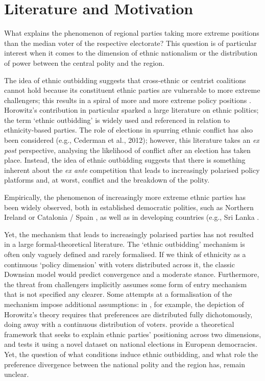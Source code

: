 \documentclass[11pt]{article}
\begin{document}
\section{Literature and Motivation}

What explains the phenomenon of regional parties taking more extreme positions than the median voter of the respective electorate? This question is of particular interest when it comes to the dimension of ethnic nationalism or the distribution of power between the central polity and the region.

The idea of ethnic outbidding suggests that cross-ethnic or centrist coalitions cannot hold because its constituent ethnic parties are vulnerable to more extreme challengers; this results in a spiral of more and more extreme policy positions \parencite{Horowitz2000, Rabushka1972, Chandra2005}. Horowitz's contribution in particular sparked a large literature on ethnic politics; the term `ethnic outbidding' is widely used and referenced in relation to ethnicity-based parties. The role of elections in spurring ethnic conflict has also been considered (e.g., Cederman et al., 2012); however, this literature takes an \textit{ex post} perspective, analysing the likelihood of conflict after an election has taken place. Instead, the idea of ethnic outbidding suggests that there is something inherent about the \textit{ex ante} competition that leads to increasingly polarised policy platforms and, at worst, conflict and the breakdown of the polity.

Empirically, the phenomenon of increasingly more extreme ethnic parties has been widely observed, both in established democratic polities, such as Northern Ireland \parencite{Coakley2008, Mitchell2009, Moore2014,DeFazio2016} or Catalonia / Spain \parencite{Barrio2017}, as well as in developing countries (e.g., Sri Lanka \parencite{DeVotta2005}.

Yet, the mechanism that leads to increasingly polarised parties has not resulted in a large formal-theoretical literature. The `ethnic outbidding' mechanism is often only vaguely defined and rarely formalised. If we think of ethnicity as a continuous `policy dimension' with voters distributed across it, the classic Downsian model would predict convergence and a moderate stance. Furthermore, the threat from challengers implicitly assumes some form of entry mechanism that is not specified any clearer. Some attempts at a formalisation of the mechanism impose additional assumptions: in \textcite{Chandra2005}, for example, the depiction of Horowitz's theory requires that preferences are distributed fully dichotomously, doing away with a continuous distribution of voters. \parencite{Zuber2015} provide a theoretical framework that seeks to explain ethnic parties' positioning across two dimensions, and tests it using a novel dataset on national elections in European democracies. Yet, the question of what conditions induce ethnic outbidding, and what role the preference divergence between the national polity and the region has, remain unclear.
\end{document}
